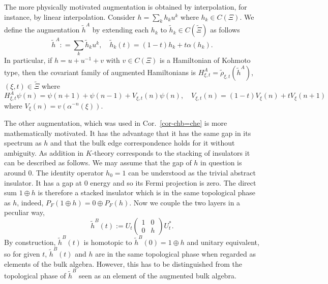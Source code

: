 \documentclass[11pt]{amsart}
\newcommand{\N}{\mathbb{N}}
\begin{document}
The more physically motivated augmentation is obtained by interpolation, for instance, by linear interpolation. 
Consider $h = \sum_{k} h_k u^k$ where $h_k\in C(\Xi)$. We define the augmentation $\tilde h^A$ by extending each $h_k$ to $\tilde h_k\in C(\tilde\Xi)$ as follows
\begin{equation}\label{eq-augA}
\tilde h^A: = \sum_{k} \tilde h_k u^k,\quad \tilde h_k(t) = (1-t) h_k + t \alpha(h_k) .
\end{equation}
In particular, if $h = u + u^{-1} + v$ with $v\in C(\Xi)$ is a Hamiltonian of Kohmoto type, then the covariant family of augmented Hamiltonians is $H_{\xi,t}^A=\tilde\rho_{\xi,t}(\tilde h^A)$, $(\xi,t)\in \tilde\Xi$ where
\begin{equation}\label{eq-augAb}
H_{\xi,t}^A\psi(n) = \psi(n+1)+\psi(n-1) + V_{\xi,t}(n)\psi(n), \quad V_{\xi,t}(n) = (1-t) V_\xi(n) + t V_\xi(n+1)
\end{equation}
where $ V_{\xi}(n) = v(\alpha^{-n}(\xi))$. 

The other augmentation, which was used in Cor.~\ref{cor-chb=che} is more mathematically motivated. It has the advantage that it has the same gap in its spectrum as $h$ and that the bulk edge correspondence holds for it without ambiguity. As addition in $K$-theory corresponds to the stacking of insulators it can be described as follows. 
We may assume that the gap of $h$ in question is around $0$. The identity operator $h_0=1$ can be understood as the trivial abstract insulator. It has a gap at $0$ energy and so its Fermi projection is zero. The direct sum $1\oplus h$ is therefore a stacked insulator which is in the same topological phase as $h$, indeed, $P_F(1\oplus h) = 0 \oplus P_F(h)$.
Now we couple the two layers in a peculiar way,
\begin{equation}\label{eq-augB}
\tilde h^B(t) := U_t \begin{pmatrix}
		1 & 0\\
		0 & h
	\end{pmatrix} U_t^*.
\end{equation}	
By construction, $\tilde h^B(t)$ is homotopic to $\tilde h^B(0) = 1\oplus h$ and unitary equivalent, so for given $t$, $	\tilde h^B(t)$ and $h$ are in the same topological phase when regarded as elements of the bulk algebra. However, this has to be distinguished from the topological phase of $\tilde h^B$ seen as an element of the augmented bulk algebra.  
\end{document}
